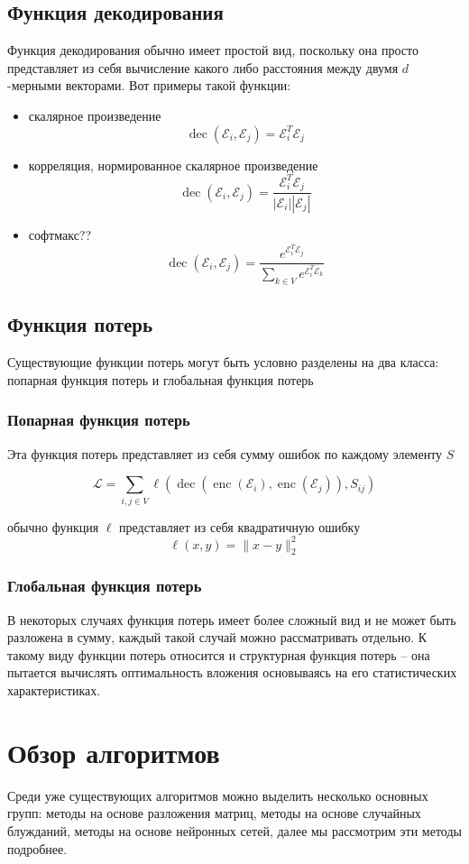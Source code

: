 \documentclass[12pt,a4paper]{extarticle}
\newcommand{\E}{\mathcal{E}}
\newcommand{\Loss}{\mathcal{L}}
\newcommand{\encoder}{\operatorname{enc}}
\newcommand{\decoder}{\operatorname{dec}}
\begin{document}
    \subsection{Функция декодирования}
    Функция декодирования обычно имеет простой вид, поскольку она просто представляет из себя вычисление какого либо расстояния между двумя $d$-мерными векторами. Вот примеры такой функции:
    \begin{itemize}
        \item скалярное произведение
            \[\decoder(\E_i, \E_j) = \E_i^T\E_j\]
        \item корреляция, нормированное скалярное произведение
            \[\decoder(\E_i, \E_j) =  \frac{\E_i^T\E_j}{|\E_i||\E_j|} \]
        \item софтмакс??
            \[\decoder(\E_i, \E_j) = \frac{e^{\E_i^T\E_j}}{\sum_{k \in V} e^{\E_i^T\E_k}}\]
    \end{itemize}
    
    \subsection{Функция потерь}
    Существующие функции потерь могут быть условно разделены на два класса: попарная функция потерь и глобальная функция потерь
    
    \subsubsection{Попарная функция потерь}
    Эта функция потерь представляет из себя сумму ошибок по каждому элементу $S$
    
    \[\Loss = \sum_{i, j \in V} \ell (\decoder(\encoder(\E_i), \encoder(\E_j)), S_{ij}) \]
    
    обычно функция $\ell$ представляет из себя квадратичную ошибку 
    \[\ell(x, y) = \lVert x - y \rVert_2^2 \]
    
    \subsubsection{Глобальная функция потерь}
    В некоторых случаях функция потерь имеет более сложный вид и не может быть разложена в сумму, каждый такой случай можно рассматривать отдельно. К такому виду функции потерь относится и структурная функция потерь -- она пытается вычислять оптимальность вложения основываясь на его статистических характеристиках.

    \section{Обзор алгоритмов}
    Среди уже существующих алгоритмов можно выделить несколько основных групп: методы на основе разложения матриц, методы на основе случайных блужданий, методы на основе нейронных сетей, далее мы рассмотрим эти методы подробнее.
\end{document}
